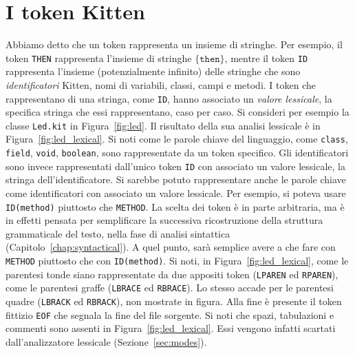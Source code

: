 \section{I token Kitten}\label{sec:token_kitten}
%
Abbiamo detto che un token rappresenta un insieme di stringhe. Per esempio,
il token \texttt{THEN} rappresenta l'insieme
di stringhe $\{\mathtt{then}\}$, mentre
il token \texttt{ID} rappresenta l'insieme (potenzialmente infinito) delle
stringhe che sono
\emph{identificatori} Kitten, \cioe nomi di variabili, classi, campi
e metodi. I token che rappresentano \piu di una stringa, come
\texttt{ID}, hanno associato un \emph{valore lessicale}, \cioe
la specifica stringa che essi rappresentano, caso per caso. Si consideri
per esempio la classe \texttt{Led.kit} in Figura~\ref{fig:led}. Il risultato
della sua analisi lessicale \`e in Figura~\ref{fig:led_lexical}.
Si noti come le parole chiave del linguaggio, come \texttt{class},
\texttt{field}, \texttt{void}, \texttt{boolean}, sono rappresentate
da un token specifico. Gli identificatori sono invece rappresentati
dall'unico token \texttt{ID} con associato un valore lessicale, \cioe
la stringa dell'identificatore. Si sarebbe potuto rappresentare anche
le parole chiave come identificatori con associato un valore lessicale.
Per esempio, si poteva usare \texttt{ID(method)} piuttosto che \texttt{METHOD}.
La scelta dei token \`e in parte arbitraria, ma \`e in effetti pensata
per semplificare la successiva ricostruzione della struttura grammaticale
del testo, nella fase di analisi sintattica (Capitolo~\ref{chap:syntactical}).
A quel punto, sar\`a \piu
semplice avere a che fare con \texttt{METHOD} piuttosto che con
\texttt{ID(method)}. Si noti, in Figura~\ref{fig:led_lexical}, come le
parentesi tonde siano rappresentate da due appositi token
(\texttt{LPAREN} ed \texttt{RPAREN}), \cosi come le parentesi
graffe (\texttt{LBRACE} ed \texttt{RBRACE}). Lo stesso accade per le
parentesi quadre (\texttt{LBRACK} ed \texttt{RBRACK}), non mostrate in figura.
Alla fine \`e presente il token fittizio \texttt{EOF} che segnala la fine
del file sorgente. Si noti che spazi, tabulazioni e commenti sono
assenti in Figura~\ref{fig:led_lexical}. Essi vengono infatti scartati
dall'analizzatore lessicale (Sezione~\ref{sec:modes}).

